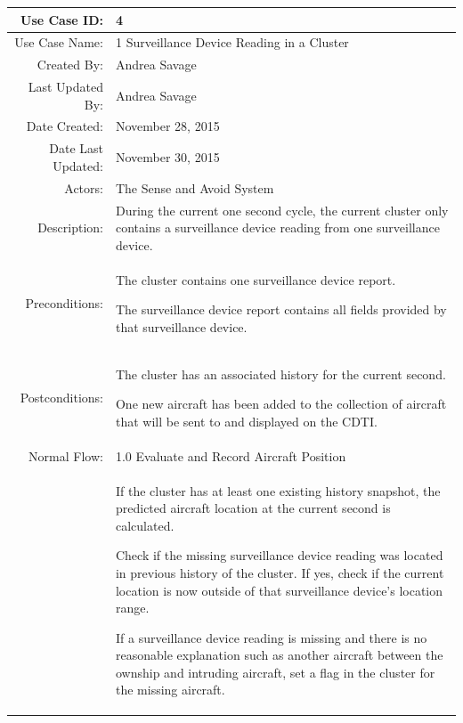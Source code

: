 \documentclass[12pt,oneside,letterpaper]{article}
\newenvironment{packed_enumerate}{ %
\vspace{-7mm}
\begin{enumerate}
  \setlength{\itemsep}{0pt}
  \setlength{\parskip}{0pt}
  \setlength{\parsep}{0pt}
}{\end{enumerate}
\vspace{-8mm}}
\begin{document}
\begin{longtable}{|r|p{3.8in}|}
\hline
Use Case ID:&4\\
\hline
Use Case Name:&1 Surveillance Device Reading in a Cluster\\
\hline
Created By:&Andrea Savage\\
\hline
Last Updated By:&Andrea Savage\\
\hline
Date Created:&November 28, 2015\\
\hline
Date Last Updated:&November 30, 2015\\
\hline
Actors:&The Sense and Avoid System\\
\hline
Description:&During the current one second cycle, the current cluster only contains a surveillance device reading from one surveillance device.\\
\hline
Preconditions:&
\begin{packed_enumerate}
\item The cluster contains one surveillance device report.
\item The surveillance device report contains all fields provided by that surveillance device.
\end{packed_enumerate}\\
\hline
Postconditions: &
\begin{packed_enumerate}
\item The cluster has an associated history for the current second.
\item One new aircraft has been added to the collection of aircraft that will be sent to and displayed on the CDTI.
\end{packed_enumerate}\\
\hline
Normal Flow:&1.0  Evaluate and Record Aircraft Position \\
&  %
\begin{packed_enumerate}
\item  If the cluster has at least one existing history snapshot, the predicted aircraft location at the current second is calculated.
\item Check if the missing surveillance device reading was located in previous history of the cluster. If yes, check if the current location is now outside of that surveillance device's location range.
\item If a surveillance device reading is missing and there is no reasonable explanation such as another aircraft between the ownship and intruding aircraft, set a flag in the cluster for the missing aircraft.

\end{packed_enumerate}
\end{longtable}
\end{document}
